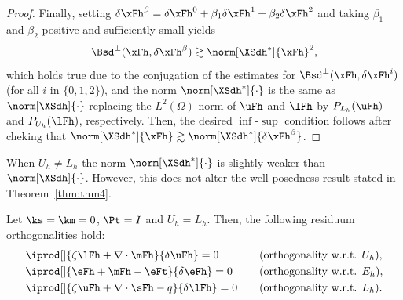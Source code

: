 \begin{proof}

Finally, setting
$\delta\xFh^\beta = \delta\xFh^0+\beta_1\delta\xFh^1+\beta_2\delta\xFh^2$
and taking $\beta_1$ and $\beta_2$ positive and sufficiently small yields
$$
\Bsd^\perp(\xFh,\delta\xFh^\beta) \gtrsim \norm[\XSdh^\ast]{\xFh}^2,
$$
which holds true due to the conjugation of the estimates for $\Bsd^\perp(\xFh,\delta\xFh^i)$ (for all $i$ in $\{0,1,2\}$), and the norm $\norm[\XSdh^\ast]{\cdot}$ is the same as $\norm[\XSdh]{\cdot}$ replacing the $L^2(\Omega)$-norm of $\uFh$ and $\lFh$ by $P_{L_h}(\uFh)$ and $P_{U_h}(\lFh)$, respectively. Then, the desired $\inf$-$\sup$ condition follows after cheking that $\norm[\XSdh^\ast]{\xFh}\gtrsim\norm[\XSdh^\ast]{\delta\xFh^\beta}$.
\end{proof}

\begin{remark}
When $U_h\not = L_h$ the norm $\norm[\XSdh^\ast]{\cdot}$ is slightly weaker than $\norm[\XSdh]{\cdot}$. However, this does not alter the well-posedness result stated in Theorem~\ref{thm:thm4}.
\end{remark}

\begin{proposition}
Let $\ks = \km = 0$, $\Pt = I$ and $U_h = L_h$. Then, the following residuum orthogonalities hold: 
\begin{alignat*}{3}
& \iprod[]{\zeta\lFh+\nabla\cdot\mFh}{\delta\uFh} =  0\quad && (\text{orthogonality w.r.t. }U_h),\\
&\iprod[]{\eFh+\mFh-\eFt                 }{\delta\eFh} = 0\quad && (\text{orthogonality w.r.t. } E_h),\\
&\iprod[]{\zeta\uFh+\nabla\cdot\sFh-q}{\delta\lFh} = 0\quad && (\text{orthogonality w.r.t. }L_h) .
\end{alignat*}
\end{proposition}

